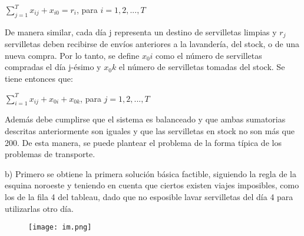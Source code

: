 \documentclass[10pt]{article}
\begin{document}
\begin{center}
$\sum_{j=1}^{T} x_{ij} + x_{i0} = r_i$, para $i=1,2,...,T$ \\
\end{center}

De manera similar, cada d\'ia j representa un destino de servilletas limpias y $r_j$ servilletas deben recibirse de env\'ios anteriores a la lavander\'ia, del stock, o de una nueva compra. Por lo tanto, se define $x_0i$ como el n\'umero de servilletas compradas el d\'ia j-\'esimo y $x_0k$ el n\'umero de servilletas tomadas del stock. Se tiene entonces que: 

\begin{center}
$\sum_{i=1}^{T} x_{ij}+x_{0i}+x_{0k}$, para $j=1,2,...,T$
\end{center}

Adem\'as debe cumplirse que el sistema es balanceado y que ambas sumatorias descritas anteriormente son iguales y que las servilletas en stock no son m\'as que 200. De esta manera, se puede plantear el problema de la forma t\'ipica de los problemas de transporte.


b) Primero se obtiene la primera soluci\'on b\'asica factible, siguiendo la regla de la esquina noroeste y teniendo en cuenta que ciertos existen viajes imposibles, como los de la fila 4 del tableau, dado que no esposible lavar servilletas del d\'ia 4 para utilizarlas otro d\'ia.

\begin{center}
\begin{figure}[ht!]
\texttt{[image: im.png]}
\end{figure}
\end{center}
\end{document}
